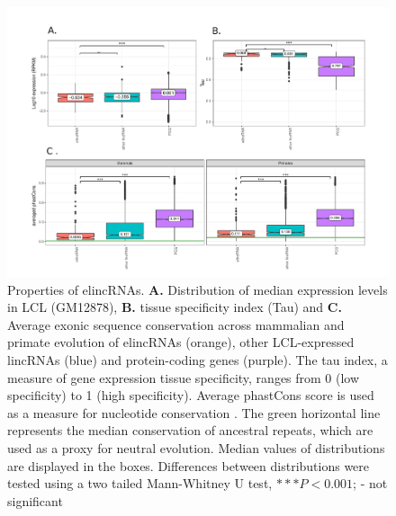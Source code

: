 \documentclass[11pt,a4paper]{report}
\begin{document}
\begin{figure}[ht]
	\includegraphics[width=1\textwidth]{Figures/1_full_characterization_elincRNA.pdf}
	\caption{Properties of elincRNAs. \textbf{A.} Distribution of median expression levels in LCL (GM12878), \textbf{B.} tissue specificity index (Tau) and \textbf{C.} Average exonic sequence conservation across mammalian and primate evolution of elincRNAs (orange), other LCL-expressed lincRNAs (blue) and protein-coding genes (purple). The tau index, a measure of gene expression tissue specificity, ranges from 0 (low specificity) to 1 (high specificity)\cite{Kryuchkova2015a}. Average phastCons score is used as a measure for nucleotide conservation \cite{Siepel2005}. The green horizontal line represents the median conservation of ancestral repeats, which are used as a proxy for neutral evolution. Median values of distributions are displayed in the boxes. Differences between distributions were tested using a two tailed Mann-Whitney U test, $***P<0.001$; - not significant}
	\label{charac_elinc}
\end{figure}
\end{document}
